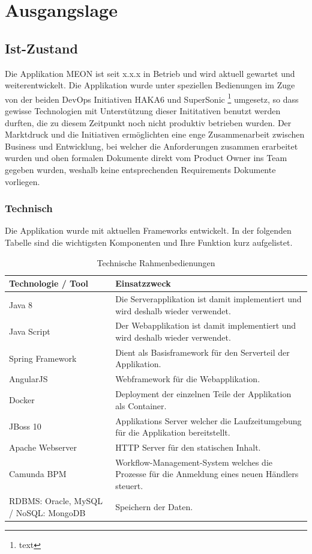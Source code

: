 \graphicspath{{./images/}}

\chapter{Ausgangslage}

\section{Ist-Zustand}

Die Applikation MEON ist seit x.x.x in Betrieb und wird aktuell gewartet und weiterentwickelt. Die Applikation wurde unter speziellen Bedienungen im Zuge von der beiden DevOps Initiativen HAKA6 und SuperSonic \footnote{text} umgesetz, so dass gewisse Technologien mit Unterstützung dieser Inititativen benutzt werden durften, die zu diesem Zeitpunkt noch nicht produktiv betrieben wurden. Der Marktdruck und die Initiativen ermöglichten eine enge Zusammenarbeit zwischen Business und Entwicklung, bei welcher die Anforderungen zusammen erarbeitet wurden und ohen formalen Dokumente direkt vom Product Owner ins Team gegeben wurden, weshalb keine entsprechenden Requirements Dokumente vorliegen.

\subsection{Technisch}

Die Applikation wurde mit aktuellen Frameworks entwickelt. In der folgenden Tabelle sind die wichtigsten Komponenten und Ihre Funktion kurz aufgelistet.

\begin{table}[H]
	\centering
	\caption{Technische Rahmenbedienungen}
	\begin{tabular}{ | p{4cm} | p{12cm} | }
		\toprule
		{\textbf{Technologie / Tool}} & {\textbf{Einsatzzweck}} \\
		\midrule
		Java 8 & Die Serverapplikation ist damit implementiert und wird deshalb wieder verwendet. \\ \hline
		Java Script & Der Webapplikation ist damit implementiert und wird deshalb wieder verwendet. \\ \hline
		Spring Framework & Dient als Basisframework für den Serverteil der Applikation.  \\ \hline
		AngularJS & Webframework für die Webapplikation. \\ \hline
		Docker & Deployment der einzelnen Teile der Applikation als Container. \\ \hline
		JBoss 10 & Applikations Server welcher die Laufzeitumgebung für die Applikation bereitstellt. \\ \hline
		Apache Webserver & HTTP Server für den statischen Inhalt. \\ \hline
		Camunda BPM & Workflow-Management-System welches die Prozesse für die Anmeldung eines neuen Händlers steuert. \\ \hline
		RDBMS: Oracle, MySQL / NoSQL: MongoDB & Speichern der Daten. \\ \hline
		\bottomrule
	\end{tabular}
\end{table}

